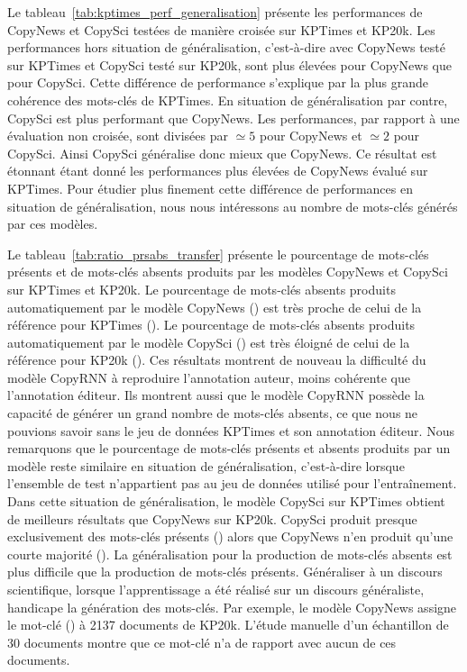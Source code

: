 

Le tableau~\ref{tab:kptimes_perf_generalisation} présente les performances de CopyNews et CopySci testées de manière croisée sur KPTimes et KP20k. 
Les performances hors situation de généralisation, c'est-à-dire avec CopyNews testé sur KPTimes et CopySci testé sur KP20k, sont plus élevées pour CopyNews que pour CopySci.
Cette différence de performance s'explique par la plus grande cohérence des mots-clés de KPTimes.
En situation de généralisation par contre, CopySci est plus performant que CopyNews. Les performances, par rapport à une évaluation non croisée, sont divisées par $\simeq5$ pour CopyNews et $\simeq2$ pour CopySci. Ainsi CopySci généralise donc mieux que CopyNews.
Ce résultat est étonnant étant donné les performances plus élevées de CopyNews évalué sur KPTimes.
Pour étudier plus finement cette différence de performances en situation de généralisation, nous nous intéressons au nombre de mots-clés générés par ces modèles.



Le tableau~\ref{tab:ratio_prsabs_transfer} présente le pourcentage de mots-clés présents et de mots-clés absents produits par les modèles CopyNews et CopySci sur KPTimes et KP20k. Le pourcentage de mots-clés absents produits automatiquement par le modèle CopyNews () est très proche de celui de la référence pour KPTimes (). 
Le pourcentage de mots-clés absents produits automatiquement par le modèle CopySci () est très éloigné de celui de la référence pour KP20k ().
Ces résultats montrent de nouveau la difficulté du modèle CopyRNN à reproduire l'annotation auteur, moins cohérente que l'annotation éditeur.
Ils montrent aussi que le modèle CopyRNN possède la capacité de générer un grand nombre de mots-clés absents, ce que nous ne pouvions savoir sans le jeu de données KPTimes et son annotation éditeur.
Nous remarquons que le pourcentage de mots-clés présents et absents produits par un modèle reste similaire en situation de généralisation, c'est-à-dire lorsque l'ensemble de test n'appartient pas au jeu de données utilisé pour l'entraînement.
Dans cette situation de généralisation, le modèle CopySci sur KPTimes obtient de meilleurs résultats que CopyNews sur KP20k. 
CopySci produit presque exclusivement des mots-clés présents () alors que CopyNews n'en produit qu'une courte majorité ().
La généralisation pour la production de mots-clés absents est plus difficile que la production de mots-clés présents. 
Généraliser à un discours scientifique, lorsque l'apprentissage a été réalisé sur un discours généraliste, handicape la génération des mots-clés. 
Par exemple, le modèle CopyNews assigne le mot-clé  () à \num{2 137} documents de KP20k.
L'étude manuelle d'un échantillon de 30 documents montre que ce mot-clé n'a de rapport avec aucun de ces documents.

